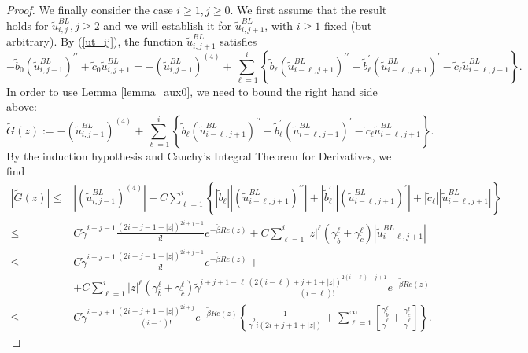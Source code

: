 \documentclass[10pt,a4paper]{amsart}
\begin{document}
\begin{proof}
We finally consider the case $i\geq 1,j\geq 0$. We first assume that the result holds for $\tilde{u}^{BL}_{i,j}, j\geq 2$ and we will establish it for $\tilde{u}^{BL}_{i,j+1}$, with $i\geq 1$ fixed (but arbitrary). By (\ref{ut_ij}), the function $\tilde{u}^{BL}_{i,j+1}$ satisfies
%
$$
-\tilde{b}_0\left(\tilde{u}_{i, j+1}^{B L}\right)^{\prime \prime}+\tilde{c}_0 \tilde{u}_{i, j+1}^{B L}=-\left(\tilde{u}_{i, j-1}^{B L}\right)^{(4)}+\sum_{\ell=1}^i\left\{\tilde{b}_{\ell}\left(\tilde{u}_{i-\ell, j+1}^{B L}\right)^{\prime \prime}+\tilde{b}_{\ell}^{\prime}\left(\tilde{u}_{i-\ell, j+1}^{B L}\right)^{\prime}-\tilde{c}_{\ell} \tilde{u}_{i-\ell, j+1}^{B L}\right\} .
$$
%
In order to use Lemma \ref{lemma_aux0}, we need to bound the right hand side above:
%
$$
\tilde{G}(z):=-\left(\tilde{u}_{i, j-1}^{B L}\right)^{(4)}+\sum_{\ell=1}^i\left\{\tilde{b}_{\ell}\left(\tilde{u}_{i-\ell, j+1}^{B L}\right)^{\prime \prime}+\tilde{b}_{\ell}^{\prime}\left(\tilde{u}_{i-\ell, j+1}^{B L}\right)^{\prime}-\tilde{c}_{\ell} \tilde{u}_{i-\ell, j+1}^{B L}\right\} .
$$
%
By the induction hypothesis and Cauchy's Integral Theorem for Derivatives, we find
%
$$
\begin{aligned}
|\tilde{G}(z)| \leq & \left|\left(\tilde{u}_{i, j-1}^{B L}\right)^{(4)}\right|+C \sum_{\ell=1}^i\left\{\left|\tilde{b}_{\ell}\right|\left|\left(\tilde{u}_{i-\ell, j+1}^{B L}\right)^{\prime \prime}\right|+\left|\tilde{b}_{\ell}^{\prime}\right|\left|\left(\tilde{u}_{i-\ell, j+1}^{B L}\right)^{\prime}\right|+\left|\tilde{c}_{\ell}\right|\left|\tilde{u}_{i-\ell, j+1}^{B L}\right|\right\} \\
\leq & C \tilde{\gamma}^{i+j-1} \frac{(2 i+j-1+|z|)^{2 i+j-1}}{i!} e^{-\tilde{\beta} R e(z)}+C \sum_{\ell=1}^i|z|^{\ell}\left(\gamma_{\tilde{b}}^{\ell}+\gamma_{\tilde{c}}^{\ell}\right)\left|\tilde{u}_{i-\ell, j+1}^{B L}\right| \\
\leq & C \tilde{\gamma}^{i+j-1} \frac{(2 i+j-1+|z|)^{2 i+j-1}}{i!} e^{-\tilde{\beta} R e(z)}+ \\
& +C \sum_{\ell=1}^i|z|^{\ell}\left(\gamma_{\bar{b}}^{\ell}+\gamma_{\tilde{c}}^{\ell}\right) \tilde{\gamma}^{i+j+1-\ell} \frac{(2(i-\ell)+j+1+|z|)^{2(i-\ell)+j+1}}{(i-\ell)!} e^{-\tilde{\beta} R e(z)} \\
\leq & C \tilde{\gamma}^{i+j+1} \frac{(2 i+j+1+|z|)^{2 i+j}}{(i-1)!} e^{-\tilde{\beta} R e(z)}\left\{\frac{1}{\tilde{\gamma}^2 i(2 i+j+1+|z|)}+\sum_{\ell=1}^{\infty}\left[\frac{\gamma_{\tilde{b}}^{\ell}}{\tilde{\gamma}^{\ell}}+\frac{\gamma_{\tilde{c}}^{\ell}}{\tilde{\gamma}^{\ell}}\right]\right\} .
\end{aligned}
$$
\end{proof}
\end{document}
